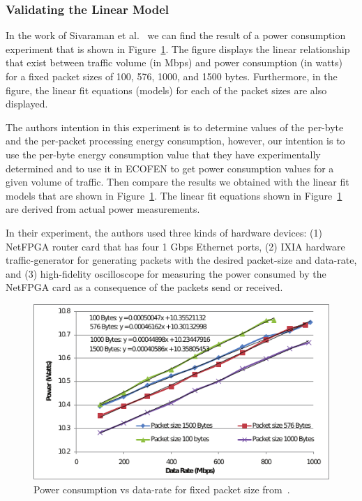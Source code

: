\subsubsection{Validating the Linear Model}
In the work of Sivaraman et al.~\cite{Sivaraman} we can find the result of a power consumption experiment that is shown in Figure~\ref{fig:powervsdatarate1}. The figure displays the linear relationship that exist between traffic volume (in Mbps) and power consumption (in watts) for a fixed packet sizes of 100, 576, 1000, and 1500 bytes. Furthermore, in the figure, the linear fit equations (models) for each of the packet sizes are also displayed. 

The authors intention in this experiment is to determine values of the per-byte and the per-packet processing energy consumption, however, our intention is to use the per-byte energy consumption value that they have experimentally determined and to use it in ECOFEN to get power consumption values for a given volume of traffic. Then compare the results we obtained with the linear fit models that are shown in Figure~\ref{fig:powervsdatarate1}. The linear fit equations shown in Figure~\ref{fig:powervsdatarate1} are derived from actual power measurements.

In their experiment, the authors used three kinds of hardware devices: (1) NetFPGA router card that has four 1 Gbps Ethernet ports, (2) IXIA hardware traffic-generator for generating packets with the desired packet-size and data-rate, and (3) high-fidelity oscilloscope for measuring the power consumed by the NetFPGA card as a consequence of the packets send or received. 

\begin{figure}[ht]
	\begin{center}
		\includegraphics[width=13cm]{images/powervsdatarate1.pdf}
		\caption{Power consumption vs data-rate for fixed packet size from~\cite{Sivaraman}.}
		\label{fig:powervsdatarate1}
	\end{center}
\end{figure}

